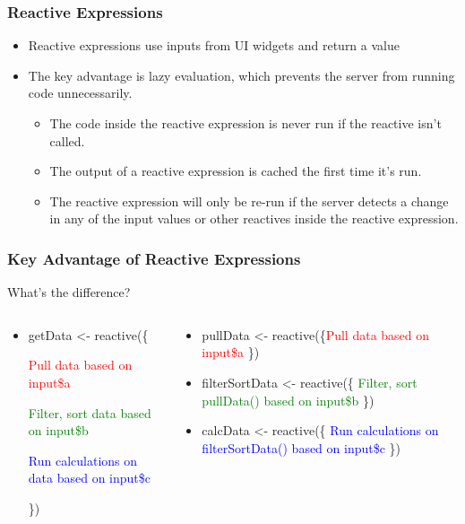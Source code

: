 \documentclass[
	11pt, %
]{beamer}
\begin{document}
\begin{frame}
	\frametitle{Reactive Expressions}
	
	\begin{itemize}
	\item Reactive expressions use inputs from UI widgets and return a value
	\item The key advantage is lazy evaluation, which prevents the server from running code unnecessarily.
	\begin{itemize}
\item The code inside the reactive expression is never run if the reactive isn't called.  
	\item The output of a reactive expression is cached the first time it's run.
	\item The reactive expression will only be re-run if the server detects a change in any of the input values or other reactives inside the reactive expression.
	\end{itemize}
	\end{itemize}
	
\end{frame}


\begin{frame}
	\frametitle{Key Advantage of Reactive Expressions}	
	
	What's the difference?	
	
	\begin{columns}
    \begin{column}{0.47\textwidth}
    \begin{itemize}        
        \item getData \textless- reactive(\{
        
			\indent \textcolor{red}{Pull data based on input\$a}
			
			\indent \textcolor{green}{Filter, sort data based on input\$b}		        

        	\indent \textcolor{blue}{Run calculations on data based on input\$c}
        	
        \})
        \end{itemize}
    \end{column}
    \begin{column}{0.5\textwidth}
       
       \begin{itemize}
       \item pullData \textless- reactive(\{\textcolor{red}{Pull data based on input\$a} \})       
       \item filterSortData \textless- reactive(\{ \textcolor{green}{Filter, sort pullData() based on input\$b} \})       
	   \item calcData \textless- reactive(\{ \textcolor{blue}{Run calculations on filterSortData() based on input\$c} \})
       \end{itemize}       

       
    \end{column}
\end{columns}
	
\end{frame}
\end{document}
